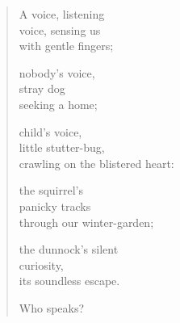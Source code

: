 

\begin{verse}
A voice, listening\\
voice, sensing us\\
with gentle fingers;

nobody's voice,\\
stray dog\\
seeking a home;

child's voice,\\
little stutter-bug,\\
crawling on the blistered heart:

the squirrel's\\
panicky tracks\\
through our winter-garden;

the dunnock's silent\\
curiosity,\\
its soundless escape.

Who speaks?
\end{verse}
